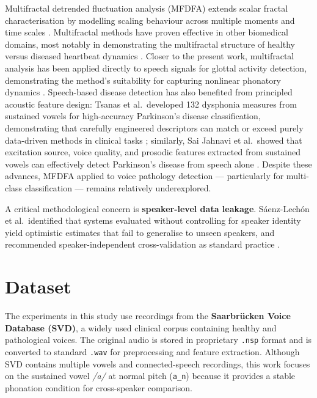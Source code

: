 \documentclass[conference]{IEEEtran}
\begin{document}
  Multifractal detrended fluctuation analysis (MFDFA) extends scalar fractal characterisation by modelling scaling behaviour across multiple moments and time scales \cite{mfdfa}. Multifractal methods have proven effective in other biomedical domains, most notably in demonstrating the multifractal structure of healthy versus diseased heartbeat dynamics \cite{ivanov1999}. Closer to the present work, multifractal analysis has been applied directly to speech signals for glottal activity detection, demonstrating the method's suitability for capturing nonlinear phonatory dynamics \cite{lal2020multifractal}. Speech-based disease detection has also benefited from principled acoustic feature design: Tsanas et al.\ developed 132 dysphonia measures from sustained vowels for high-accuracy Parkinson's disease classification, demonstrating that carefully engineered descriptors can match or exceed purely data-driven methods in clinical tasks \cite{tsanas2012}; similarly, Sai Jahnavi et al.\ showed that excitation source, voice quality, and prosodic features extracted from sustained vowels can effectively detect Parkinson's disease from speech alone \cite{jahnavi2020}. Despite these advances, MFDFA applied to voice pathology detection — particularly for multi-class classification — remains relatively underexplored.

  A critical methodological concern is \textbf{speaker-level data leakage}. Sáenz-Lechón et al.\ identified that systems evaluated without controlling for speaker identity yield optimistic estimates that fail to generalise to unseen speakers, and recommended speaker-independent cross-validation as standard practice \cite{saenzlechon2006}.


  \section{Dataset}
  \label{sec:dataset}

  The experiments in this study use recordings from the \textbf{Saarbrücken Voice Database (SVD)}, a widely used clinical corpus containing healthy and pathological voices. The original audio is stored in proprietary \texttt{.nsp} format and is converted to standard \texttt{.wav} for preprocessing and feature extraction. Although SVD contains multiple vowels and connected-speech recordings, this work focuses on the sustained vowel \textit{/a/} at normal pitch (\texttt{a\_n}) because it provides a stable phonation condition for cross-speaker comparison.
\end{document}
